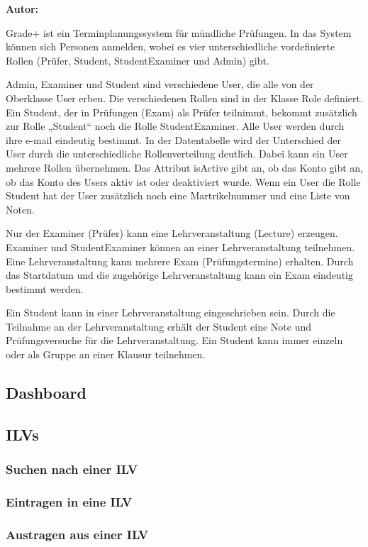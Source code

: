 \textbf{Autor:}

\glqq{}Grade+\grqq{} ist ein Terminplanungssystem für mündliche Prüfungen. In das System können sich Personen anmelden, wobei es vier unterschiedliche vordefinierte Rollen (Prüfer, Student, StudentExaminer und Admin) gibt. 




Admin, Examiner und Student sind verschiedene User, die alle von der Oberklasse User erben.
Die verschiedenen Rollen sind in der Klasse Role definiert. Ein Student, der in Prüfungen (Exam) als Prüfer teilnimmt, bekommt zusätzlich zur Rolle „Student“ noch die Rolle
StudentExaminer.
Alle User werden durch ihre e-mail eindeutig bestimmt. 
In der Datentabelle wird der Unterschied der User durch die unterschiedliche Rollenverteilung deutlich. Dabei kann ein User mehrere Rollen übernehmen.
Das Attribut isActive gibt an, ob das Konto gibt an, ob das Konto des Users aktiv ist oder deaktiviert wurde.
Wenn ein User die Rolle Student hat der User zusätzlich noch eine Martrikelnummer und eine Liste von Noten.


Nur der Examiner (Prüfer) kann eine Lehrveranstaltung (Lecture) erzeugen. 
Examiner und StudentExaminer können an einer Lehrveranstaltung teilnehmen.
Eine Lehrveranstaltung kann mehrere Exam (Prüfungstermine) erhalten.
Durch das Startdatum und die zugehörige Lehrveranstaltung kann ein Exam eindeutig bestimmt werden.


Ein Student kann in einer Lehrveranstaltung eingeschrieben sein. Durch die Teilnahme an der Lehrveranstaltung erhält der Student eine Note und Prüfungsversuche für die Lehrveranstaltung. Ein Student kann immer einzeln oder als Gruppe an einer Klausur teilnehmen.
\subsection{Dashboard}
\subsection{ILVs}
\subsubsection{Suchen nach einer ILV}
\subsubsection{Eintragen in eine ILV}
\subsubsection{Austragen aus einer ILV}
